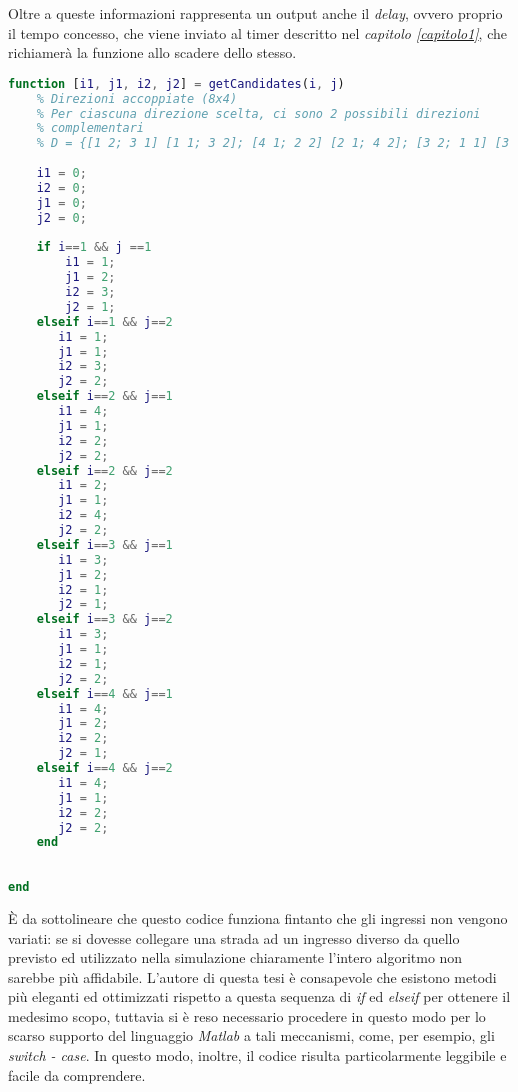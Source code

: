 Oltre a queste informazioni rappresenta un output anche il \textit{delay}, ovvero proprio il tempo concesso, che viene inviato al timer descritto nel \textit{capitolo \ref{capitolo1}}, che richiamerà la funzione allo scadere dello stesso.
\newpage
\begin{lstlisting}[language=Matlab,label=key,caption=Scelta delle due strade complementari a quella selezionata come principale]
    function [i1, j1, i2, j2] = getCandidates(i, j)
    % Direzioni accoppiate (8x4)
    % Per ciascuna direzione scelta, ci sono 2 possibili direzioni
    % complementari
    % D = {[1 2; 3 1] [1 1; 3 2]; [4 1; 2 2] [2 1; 4 2]; [3 2; 1 1] [3 1; 1 2]; [4 2; 2 1] [4 1; 2 2]};
    
    i1 = 0;
    i2 = 0;
    j1 = 0;
    j2 = 0;
    
    if i==1 && j ==1
        i1 = 1;
        j1 = 2;
        i2 = 3;
        j2 = 1;
    elseif i==1 && j==2
       i1 = 1;
       j1 = 1;
       i2 = 3;
       j2 = 2;
    elseif i==2 && j==1
       i1 = 4;
       j1 = 1;
       i2 = 2;
       j2 = 2;
    elseif i==2 && j==2
       i1 = 2;
       j1 = 1;
       i2 = 4;
       j2 = 2;
    elseif i==3 && j==1
       i1 = 3;
       j1 = 2;
       i2 = 1;
       j2 = 1;
    elseif i==3 && j==2
       i1 = 3;
       j1 = 1;
       i2 = 1;
       j2 = 2;
    elseif i==4 && j==1
       i1 = 4;
       j1 = 2;
       i2 = 2;
       j2 = 1;
    elseif i==4 && j==2
       i1 = 4;
       j1 = 1;
       i2 = 2;
       j2 = 2;
    end
            
        
end
\end{lstlisting}

È da sottolineare che questo codice funziona fintanto che gli ingressi non vengono variati: se si dovesse collegare una strada ad un ingresso diverso da quello previsto ed utilizzato nella simulazione chiaramente l’intero algoritmo non sarebbe più affidabile. L'autore di questa tesi è consapevole che esistono metodi più eleganti ed ottimizzati rispetto a questa sequenza di \textit{if} ed \textit{elseif} per ottenere il medesimo scopo, tuttavia si è reso necessario procedere in questo modo per lo scarso supporto del linguaggio \textit{Matlab} a tali meccanismi, come, per esempio, gli \textit{switch - case}. In questo modo, inoltre, il codice risulta particolarmente leggibile e facile da comprendere.
\newline

